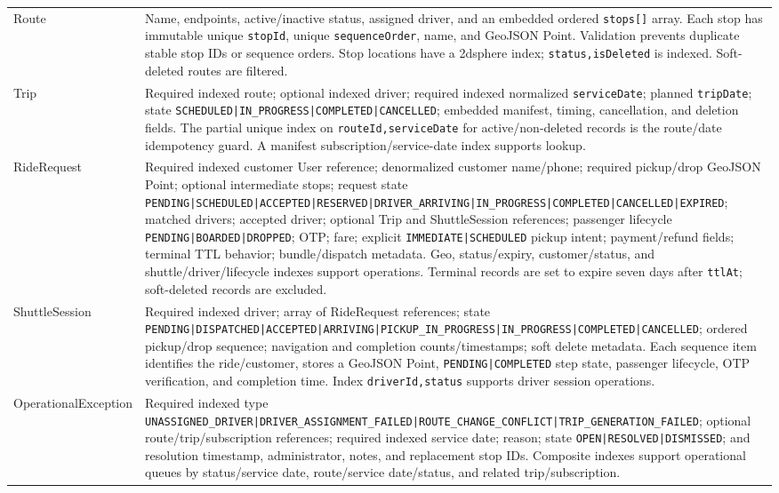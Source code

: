 \documentclass[11pt,a4paper]{article}
\newcommand{\code}[1]{\texttt{#1}}
\begin{document}
\begin{longtable}{p{} p{}}
Route & Name, endpoints, active/inactive status, assigned driver, and an embedded ordered \code{stops[]} array. Each stop has immutable unique \code{stopId}, unique \code{sequenceOrder}, name, and GeoJSON Point. Validation prevents duplicate stable stop IDs or sequence orders. Stop locations have a 2dsphere index; \code{status,isDeleted} is indexed. Soft-deleted routes are filtered. \\
Trip & Required indexed route; optional indexed driver; required indexed normalized \code{serviceDate}; planned \code{tripDate}; state \code{SCHEDULED|IN\_PROGRESS|COMPLETED|CANCELLED}; embedded manifest, timing, cancellation, and deletion fields. The partial unique index on \code{routeId,serviceDate} for active/non-deleted records is the route/date idempotency guard. A manifest subscription/service-date index supports lookup. \\
RideRequest & Required indexed customer User reference; denormalized customer name/phone; required pickup/drop GeoJSON Point; optional intermediate stops; request state \code{PENDING|SCHEDULED|ACCEPTED|RESERVED|DRIVER\_ARRIVING|IN\_PROGRESS|COMPLETED|CANCELLED|EXPIRED}; matched drivers; accepted driver; optional Trip and ShuttleSession references; passenger lifecycle \code{PENDING|BOARDED|DROPPED}; OTP; fare; explicit \code{IMMEDIATE|SCHEDULED} pickup intent; payment/refund fields; terminal TTL behavior; bundle/dispatch metadata. Geo, status/expiry, customer/status, and shuttle/driver/lifecycle indexes support operations. Terminal records are set to expire seven days after \code{ttlAt}; soft-deleted records are excluded. \\
ShuttleSession & Required indexed driver; array of RideRequest references; state \code{PENDING|DISPATCHED|ACCEPTED|ARRIVING|PICKUP\_IN\_PROGRESS|IN\_PROGRESS|COMPLETED|CANCELLED}; ordered pickup/drop sequence; navigation and completion counts/timestamps; soft delete metadata. Each sequence item identifies the ride/customer, stores a GeoJSON Point, \code{PENDING|COMPLETED} step state, passenger lifecycle, OTP verification, and completion time. Index \code{driverId,status} supports driver session operations. \\
OperationalException & Required indexed type \code{UNASSIGNED\_DRIVER|DRIVER\_ASSIGNMENT\_FAILED|ROUTE\_CHANGE\_CONFLICT|TRIP\_GENERATION\_FAILED}; optional route/trip/subscription references; required indexed service date; reason; state \code{OPEN|RESOLVED|DISMISSED}; and resolution timestamp, administrator, notes, and replacement stop IDs. Composite indexes support operational queues by status/service date, route/service date/status, and related trip/subscription. \\
\bottomrule
\end{longtable}
\end{document}
